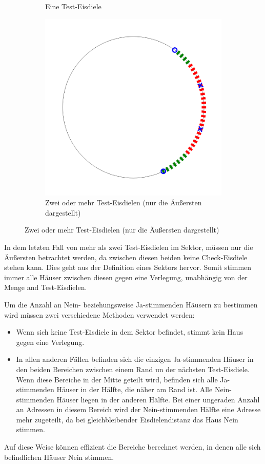 \documentclass[a4paper,10pt,ngerman]{scrartcl}
\newcommand{\imageWidth}{0.3\linewidth}
\begin{document}
\begin{figure}[h!]
\begin{subfigure}[t]{\imageWidth}
        \caption{Eine Test-Eisdiele}
        \label{fig:07_one_test_ice}
    \end{subfigure}
    \begin{subfigure}[t]{\imageWidth}
        \includegraphics[width=\linewidth]{08_two_test_ice.png}
        \caption{Zwei oder mehr Test-Eisdielen (nur die Äußersten dargestellt)}
        \label{fig:08_two_test_ice}
    \end{subfigure}
\end{figure}

In dem letzten Fall von mehr als zwei Test-Eisdielen im Sektor, müssen nur die Äußersten betrachtet werden, da zwischen diesen beiden keine Check-Eisdiele stehen kann.
Dies geht aus der Definition eines Sektors hervor.
Somit stimmen immer alle Häuser zwischen diesen gegen eine Verlegung, unabhängig von der Menge and Test-Eisdielen.

Um die Anzahl an Nein- beziehungsweise Ja-stimmenden Häusern zu bestimmen wird müssen zwei verschiedene Methoden verwendet werden:
\begin{itemize}
    \item Wenn sich keine Test-Eisdiele in dem Sektor befindet, stimmt kein Haus gegen eine Verlegung.
    \item In allen anderen Fällen befinden sich die einzigen Ja-stimmenden Häuser in den beiden Bereichen zwischen einem Rand un der nächsten Test-Eisdiele.
          Wenn diese Bereiche in der Mitte geteilt wird, befinden sich alle Ja-stimmenden Häuser in der Hälfte, die näher am Rand ist.
          Alle Nein-stimmenden Häuser liegen in der anderen Hälfte.
          Bei einer ungeraden Anzahl an Adressen in diesem Bereich wird der Nein-stimmenden Hälfte eine Adresse mehr zugeteilt, da bei gleichbleibender Eisdielendistanz das Haus Nein stimmen.
\end{itemize}
Auf diese Weise können effizient die Bereiche berechnet werden, in denen alle sich befindlichen Häuser Nein stimmen.
\end{document}
